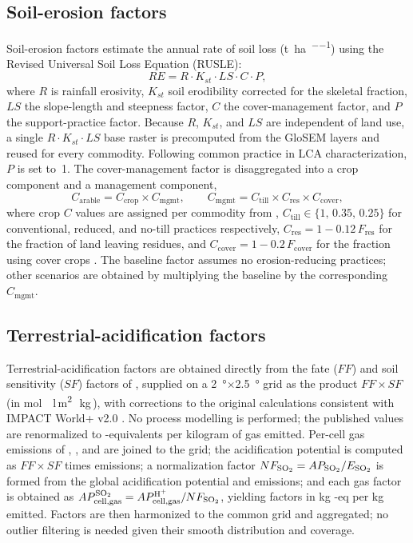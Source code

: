 \documentclass[11pt]{article}
\begin{document}
\subsection{Soil-erosion factors}
\label{sec:erosion}
Soil-erosion factors estimate the annual rate of soil loss
(\si{\tonne\per\hectare\per\year}) using the Revised Universal Soil Loss Equation
(RUSLE):
\begin{equation}
RE = R\cdot K_{st}\cdot LS\cdot C\cdot P,
\label{eq:rusle}
\end{equation}
where $R$ is rainfall erosivity, $K_{st}$ soil erodibility corrected for the skeletal
fraction, $LS$ the slope-length and steepness factor, $C$ the cover-management factor,
and $P$ the support-practice factor. Because $R$, $K_{st}$, and $LS$ are independent of
land use, a single $R\cdot K_{st}\cdot LS$ base raster is precomputed from the
GloSEM layers \citep{borrelli2017,panagos2015} and reused for every commodity. Following
common practice in LCA characterization, $P$ is set to~1. The cover-management factor is
disaggregated into a crop component and a management component,
\begin{equation}
C_{\text{arable}} = C_{\text{crop}}\times C_{\text{mgmt}}, \qquad
C_{\text{mgmt}} = C_{\text{till}}\times C_{\text{res}}\times C_{\text{cover}},
\end{equation}
where crop $C$ values are assigned per commodity from \citet{borrelli2017},
$C_{\text{till}} \in \{1,\,0.35,\,0.25\}$ for conventional, reduced, and no-till
practices respectively, $C_{\text{res}} = 1 - 0.12\,F_{\text{res}}$ for the fraction of
land leaving residues, and $C_{\text{cover}} = 1 - 0.2\,F_{\text{cover}}$ for the
fraction using cover crops \citep{panagos2015}. The baseline factor assumes no
erosion-reducing practices; other scenarios are obtained by multiplying the baseline by
the corresponding $C_{\text{mgmt}}$.

\subsection{Terrestrial-acidification factors}
\label{sec:acid}
Terrestrial-acidification factors are obtained directly from the fate ($FF$) and soil
sensitivity ($SF$) factors of \citet{roy2014}, supplied on a
\SI{2}{\degree}$\times$\SI{2.5}{\degree} grid as the product $FF\times SF$ (in
\si{\mol} \,\si{\per\litre}\,\si{\square\metre}\,\si{\per\kilogram}\,\si{\year}),
with corrections to the original calculations consistent with IMPACT World+ v2.0
\citep{impactworldplus}. No process modelling is performed; the published values are
renormalized to -equivalents per kilogram of gas emitted. Per-cell gas
emissions of , , and  are joined to the grid; the 
acidification potential is computed as $FF\times SF$ times emissions; a normalization
factor $NF_{\ce{SO2}} = AP_{\ce{SO2}}/E_{\ce{SO2}}$ is formed from the global 
acidification potential and emissions; and each gas factor is obtained as
$AP^{\ce{SO2}}_{\text{cell,gas}} = AP^{\ce{H+}}_{\text{cell,gas}}/NF_{\ce{SO2}}$,
yielding factors in \si{\kilogram} -eq per \si{\kilogram} emitted. Factors are
then harmonized to the common grid and aggregated; no outlier filtering is needed given
their smooth distribution and coverage.
\end{document}

